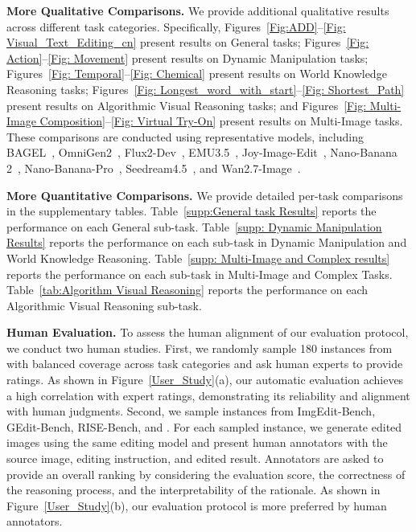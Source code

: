 \textbf{More Qualitative Comparisons.}
We provide additional qualitative results across different task categories. Specifically, Figures~\ref{Fig:ADD}--\ref{Fig: Visual_Text_Editing_cn} present results on General tasks; Figures~\ref{Fig: Action}--\ref{Fig: Movement} present results on Dynamic Manipulation tasks; Figures~\ref{Fig: Temporal}--\ref{Fig: Chemical} present results on World Knowledge Reasoning tasks; Figures~\ref{Fig: Longest_word_with_start}--\ref{Fig: Shortest_Path} present results on Algorithmic Visual Reasoning tasks; and Figures~\ref{Fig: Multi-Image Composition}--\ref{Fig: Virtual Try-On} present results on Multi-Image tasks. These comparisons are conducted using representative models, including BAGEL~\cite{zhao2025envisioning}, OmniGen2~\cite{wu2025omnigen2}, Flux2-Dev~\cite{flux-2-2025}, EMU3.5~\cite{cui2025emu3}, Joy-Image-Edit~\cite{joyaiimage2026}, Nano-Banana 2~\cite{google2026gemini31flashimagepreview}, Nano-Banana-Pro~\cite{nanobananapro}, Seedream4.5~\cite{seedream2025seedream}, and Wan2.7-Image~\cite{wan}.

\textbf{More Quantitative Comparisons.}
We provide detailed per-task comparisons in the supplementary tables. Table~\ref{supp:General task Results} reports the performance on each General sub-task. Table~\ref{supp: Dynamic Manipulation Results} reports the performance on each sub-task in Dynamic Manipulation and World Knowledge Reasoning. Table~\ref{supp: Multi-Image and Complex results} reports the performance on each sub-task in Multi-Image and Complex Tasks. Table~\ref{tab:Algorithm Visual Reasoning} reports the performance on each Algorithmic Visual Reasoning sub-task.

\textbf{Human Evaluation.}
To assess the human alignment of our evaluation protocol, we conduct two human studies. First, we randomly sample 180 instances from {\bench} with balanced coverage across task categories and ask human experts to provide ratings. As shown in Figure~\ref{User_Study}(a), our automatic evaluation achieves a high correlation with expert ratings, demonstrating its reliability and alignment with human judgments.
Second, we sample instances from ImgEdit-Bench, GEdit-Bench, RISE-Bench, and {\bench}. For each sampled instance, we generate edited images using the same editing model and present human annotators with the source image, editing instruction, and edited result. Annotators are asked to provide an overall ranking by considering the evaluation score, the correctness of the reasoning process, and the interpretability of the rationale. As shown in Figure~\ref{User_Study}(b), our evaluation protocol is more preferred by human annotators.

